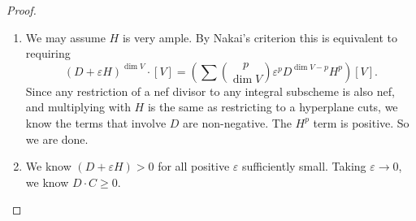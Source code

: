 \documentclass[a4paper]{article}
\begin{document}
\begin{proof}\leavevmode
  \begin{enumerate}
    \item We may assume $H$ is very ample. By Nakai's criterion this is equivalent to requiring
      \[
        (D + \varepsilon H)^{\dim V}\cdot [V] = \left(\sum \binom{p}{\dim V} \varepsilon^p D^{\dim V - p} H^p\right)[V].
      \]
      Since any restriction of a nef divisor to any integral subscheme is also nef, and multiplying with $H$ is the same as restricting to a hyperplane cuts, we know the terms that involve $D$ are non-negative. The $H^p$ term is positive. So we are done.

    \item We know $(D + \varepsilon H) > 0$ for all positive $\varepsilon$ sufficiently small. Taking $\varepsilon \to 0$, we know $D \cdot C \geq 0$.\qedhere
  \end{enumerate}
\end{proof}
\end{document}
